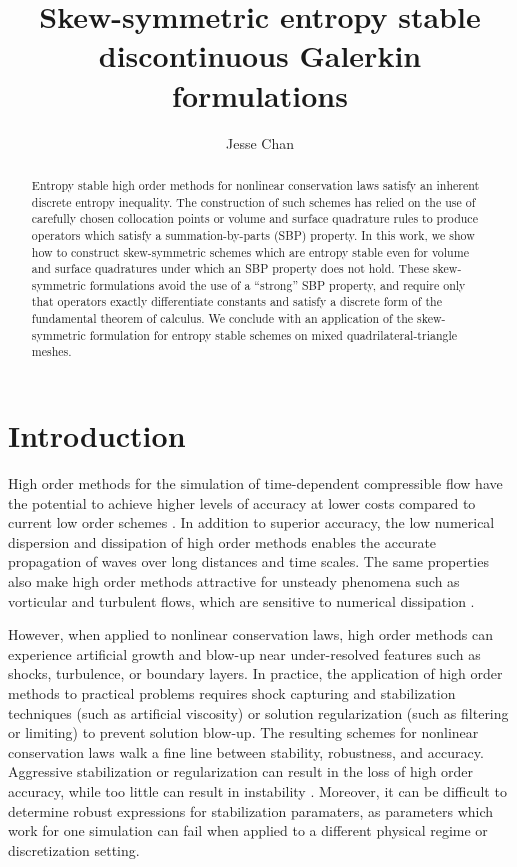 \documentclass{svjour3}                     %
\date{}
\author{Jesse Chan}
\title{Skew-symmetric entropy stable discontinuous Galerkin formulations}
\begin{document}
\maketitle

\begin{abstract}
Entropy stable high order methods for nonlinear conservation laws satisfy an inherent discrete entropy inequality.  The construction of such schemes has relied on the use of carefully chosen collocation points \cite{gassner2013skew, fisher2013high, carpenter2014entropy, chan2018efficient} or volume and surface quadrature rules \cite{chan2017discretely, chan2018discretely} to produce operators which satisfy a summation-by-parts (SBP) property.  In this work, we show how to construct skew-symmetric schemes which are entropy stable even for volume and surface quadratures under which an SBP property does not hold.  These skew-symmetric formulations avoid the use of a ``strong'' SBP property, and require only that operators exactly differentiate constants and satisfy a discrete form of the fundamental theorem of calculus.   We conclude with an application of the skew-symmetric formulation for entropy stable schemes on mixed quadrilateral-triangle meshes. 
\end{abstract}


\section{Introduction}

High order methods for the simulation of time-dependent compressible flow have the potential to achieve higher levels of accuracy at lower costs compared to current low order schemes \cite{wang2013high}.  In addition to superior accuracy, the low numerical dispersion and dissipation of high order methods \cite{ainsworth2004dispersive} enables the accurate propagation of waves over long distances and time scales.  The same properties also make high order methods attractive for unsteady phenomena such as vorticular and turbulent flows, which are sensitive to numerical dissipation \cite{visbal1999high, wang2013high}.  

However, when applied to nonlinear conservation laws, high order methods can experience artificial growth and blow-up near under-resolved features such as shocks, turbulence, or boundary layers.  In practice, the application of high order methods to practical problems requires shock capturing and stabilization techniques (such as artificial viscosity) or solution regularization (such as filtering or limiting) to prevent solution blow-up.  The resulting schemes for nonlinear conservation laws walk a fine line between stability, robustness, and accuracy.  Aggressive stabilization or regularization can result in the loss of high order accuracy, while too little can result in instability \cite{wang2013high}.  Moreover, it can be difficult to determine robust expressions for stabilization paramaters, as parameters which work for one simulation can fail when applied to a different physical regime or discretization setting.  
\end{document}
